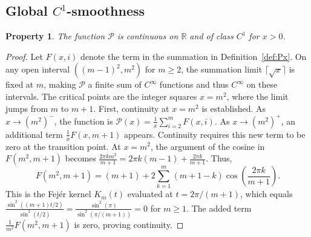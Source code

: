 \documentclass[11pt,a4paper]{amsart}
\newcommand{\Px}{\mathcal{P}}
\newcommand{\R}{\mathbb{R}}
\theoremstyle{plain}
\newtheorem{property}[theorem]{Property}
\theoremstyle{definition}
\begin{document}
\subsection{Global $C^{1}$-smoothness}
\begin{property}\label{prop:C1}
The function $\Px$ is continuous on $\R$ and of class $C^1$ for $x>0$.
\end{property}
\begin{proof}
Let $F(x,i)$ denote the term in the summation in Definition~\ref{def:Px}. On any open interval $((m-1)^2, m^2)$ for $m\ge 2$, the summation limit $\lceil\sqrt{x}\rceil$ is fixed at $m$, making $\Px$ a finite sum of $C^\infty$ functions and thus $C^\infty$ on these intervals. The critical points are the integer squares $x=m^2$, where the limit jumps from $m$ to $m+1$.
First, continuity at $x=m^2$ is established. As $x \to (m^2)^-$, the function is $\Px(x) = \frac{1}{x}\sum_{i=2}^{m} F(x,i)$. As $x \to (m^2)^+$, an additional term $\frac{1}{x}F(x,m+1)$ appears. Continuity requires this new term to be zero at the transition point.
At $x=m^2$, the argument of the cosine in $F(m^2, m+1)$ becomes $\frac{2\pi k m^2}{m+1} = 2\pi k(m-1) + \frac{2\pi k}{m+1}$. Thus,
\[ F(m^2, m+1) = (m+1) + 2\sum_{k=1}^{m}(m+1-k)\cos\left(\frac{2\pi k}{m+1}\right). \]
This is the Fejér kernel $K_m(t)$ evaluated at $t=2\pi/(m+1)$, which equals $\frac{\sin^2((m+1)t/2)}{\sin^2(t/2)} = \frac{\sin^2(\pi)}{\sin^2(\pi/(m+1))} = 0$ for $m \ge 1$. The added term $\frac{1}{m^2}F(m^2, m+1)$ is zero, proving continuity.


\end{proof}
\end{document}
